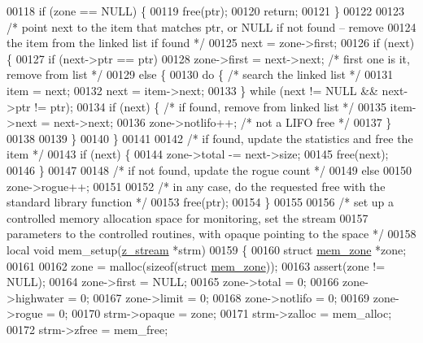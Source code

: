 \begin{DoxyCode}
00118     \textcolor{keywordflow}{if} (zone == NULL) \{
00119         free(ptr);
00120         \textcolor{keywordflow}{return};
00121     \}
00122 
00123     \textcolor{comment}{/* point next to the item that matches ptr, or NULL if not found -- remove}
00124 \textcolor{comment}{       the item from the linked list if found */}
00125     next = zone->first;
00126     \textcolor{keywordflow}{if} (next) \{
00127         \textcolor{keywordflow}{if} (next->ptr == ptr)
00128             zone->first = next->next;   \textcolor{comment}{/* first one is it, remove from list */}
00129         \textcolor{keywordflow}{else} \{
00130             \textcolor{keywordflow}{do} \{                        \textcolor{comment}{/* search the linked list */}
00131                 item = next;
00132                 next = item->next;
00133             \} \textcolor{keywordflow}{while} (next != NULL && next->ptr != ptr);
00134             \textcolor{keywordflow}{if} (next) \{                 \textcolor{comment}{/* if found, remove from linked list */}
00135                 item->next = next->next;
00136                 zone->notlifo++;        \textcolor{comment}{/* not a LIFO free */}
00137             \}
00138 
00139         \}
00140     \}
00141 
00142     \textcolor{comment}{/* if found, update the statistics and free the item */}
00143     \textcolor{keywordflow}{if} (next) \{
00144         zone->total -= next->size;
00145         free(next);
00146     \}
00147 
00148     \textcolor{comment}{/* if not found, update the rogue count */}
00149     \textcolor{keywordflow}{else}
00150         zone->rogue++;
00151 
00152     \textcolor{comment}{/* in any case, do the requested free with the standard library function */}
00153     free(ptr);
00154 \}
00155 
00156 \textcolor{comment}{/* set up a controlled memory allocation space for monitoring, set the stream}
00157 \textcolor{comment}{   parameters to the controlled routines, with opaque pointing to the space */}
00158 local \textcolor{keywordtype}{void} mem\_setup(\hyperlink{structz__stream__s}{z\_stream} *strm)
00159 \{
00160     \textcolor{keyword}{struct }\hyperlink{structmem__zone}{mem\_zone} *zone;
00161 
00162     zone = malloc(\textcolor{keyword}{sizeof}(\textcolor{keyword}{struct} \hyperlink{structmem__zone}{mem\_zone}));
00163     assert(zone != NULL);
00164     zone->first = NULL;
00165     zone->total = 0;
00166     zone->highwater = 0;
00167     zone->limit = 0;
00168     zone->notlifo = 0;
00169     zone->rogue = 0;
00170     strm->opaque = zone;
00171     strm->zalloc = mem\_alloc;
00172     strm->zfree = mem\_free;

\end{DoxyCode}
